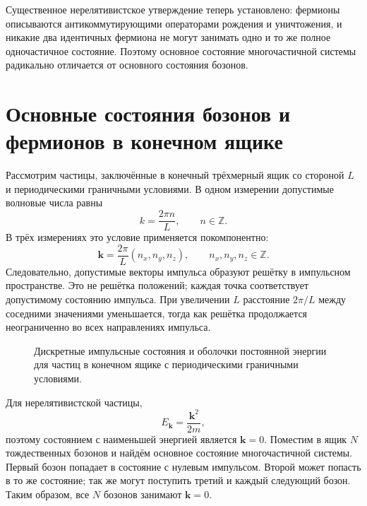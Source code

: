 Существенное нерелятивистское утверждение теперь установлено: фермионы описываются антикоммутирующими операторами рождения и уничтожения, и никакие два идентичных фермиона не могут занимать одно и то же полное одночастичное состояние. Поэтому основное состояние многочастичной системы радикально отличается от основного состояния бозонов.

\section{Основные состояния бозонов и фермионов в конечном ящике}

Рассмотрим частицы, заключённые в конечный трёхмерный ящик со стороной \(L\) и периодическими граничными условиями. В одном измерении допустимые волновые числа равны
\begin{equation}
k=\frac{2\pi n}{L},
\qquad n\in\mathbb{Z}.
\end{equation}
В трёх измерениях это условие применяется покомпонентно:
\begin{equation}
\mathbf{k}=\frac{2\pi}{L}(n_x,n_y,n_z),
\qquad n_x,n_y,n_z\in\mathbb{Z}.
\end{equation}
Следовательно, допустимые векторы импульса образуют решётку в импульсном пространстве. Это не решётка положений; каждая точка соответствует допустимому состоянию импульса. При увеличении \(L\) расстояние \(2\pi/L\) между соседними значениями уменьшается, тогда как решётка продолжается неограниченно во всех направлениях импульса.

\begin{figure}
\centering
{}
\caption{Дискретные импульсные состояния и оболочки постоянной энергии для частиц в конечном ящике с периодическими граничными условиями.}
\end{figure}

Для нерелятивистской частицы,
\begin{equation}
E_{\mathbf{k}}=\frac{\mathbf{k}^2}{2m},
\end{equation}
поэтому состоянием с наименьшей энергией является \(\mathbf{k}=0\). Поместим в ящик \(N\) тождественных бозонов и найдём основное состояние многочастичной системы. Первый бозон попадает в состояние с нулевым импульсом. Второй может попасть в то же состояние; так же могут поступить третий и каждый следующий бозон. Таким образом, все \(N\) бозонов занимают \(\mathbf{k}=0\).

